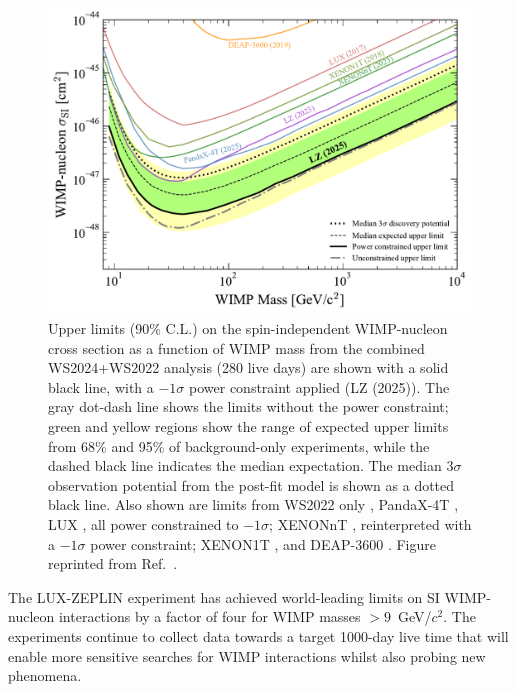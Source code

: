 \begin{figure}
    \centering
    \includegraphics[width=0.7\linewidth]{figures/WS2024Result/figure5.pdf}
    \caption[Upper limits (90\% C.L.) on the spin-independent WIMP-nucleon cross section as a function of WIMP mass from the combined WS2024+WS2022 analysis (280 live days).]{Upper limits (90\% C.L.) on the spin-independent WIMP-nucleon cross section as a function of WIMP mass from the combined WS2024+WS2022 analysis (280 live days) are shown with a solid black line, with a $-1\sigma$ power constraint applied (LZ (2025)). The gray dot-dash line shows the limits without the power constraint; green and yellow regions show the range of expected upper limits from 68\% and 95\% of background-only experiments, while the dashed black line indicates the median expectation. The median $3\sigma$ observation potential from the post-fit model is shown as a dotted black line. Also shown are limits from WS2022 only \cite{LZ:2022lsv}, PandaX-4T \cite{PandaX-4T:2021bab}, LUX \cite{LUX:2016ggv}, all power constrained to $-1\sigma$; XENONnT \cite{XENONnTPres}, reinterpreted with a $-1\sigma$ power constraint; XENON1T \cite{XENON2018}, and DEAP-3600 \cite{DEAP:2019yzn}. Figure reprinted from Ref.~\cite{LZCollaboration:2024lux}.}
    \label{fig:WS2024Result/fig5}
\end{figure}

The LUX-ZEPLIN experiment has achieved world-leading limits on SI WIMP-nucleon interactions by a factor of four for WIMP masses $>9$~GeV/$c^2$. The experiments continue to collect data towards a target 1000-day live time that will enable more sensitive searches for WIMP interactions whilst also probing new phenomena.